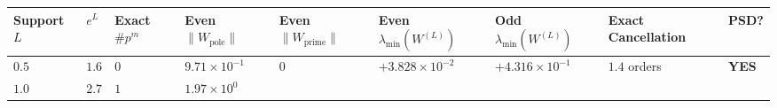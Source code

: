 \documentclass[
  11pt,
]{article}
\newcounter{none} %
\begin{document}
{\def\LTcaptype{none} %
\begin{longtable}[]{@{}
  >{\centering\arraybackslash}p{}
  >{\centering\arraybackslash}p{}
  >{\centering\arraybackslash}p{}
  >{\centering\arraybackslash}p{}
  >{\centering\arraybackslash}p{}
  >{\centering\arraybackslash}p{}
  >{\centering\arraybackslash}p{}
  >{\centering\arraybackslash}p{}
  >{\centering\arraybackslash}p{}@{}}
\toprule\noalign{}
\begin{minipage}[b]{\linewidth}\centering
Support \(L\)
\end{minipage} & \begin{minipage}[b]{\linewidth}\centering
\(e^L\)
\end{minipage} & \begin{minipage}[b]{\linewidth}\centering
Exact \(\#p^m\)
\end{minipage} & \begin{minipage}[b]{\linewidth}\centering
Even \(\|W_{\text{pole}}\|\)
\end{minipage} & \begin{minipage}[b]{\linewidth}\centering
Even \(\|W_{\text{prime}}\|\)
\end{minipage} & \begin{minipage}[b]{\linewidth}\centering
Even \(\lambda_{\min}(W^{(L)})\)
\end{minipage} & \begin{minipage}[b]{\linewidth}\centering
Odd \(\lambda_{\min}(W^{(L)})\)
\end{minipage} & \begin{minipage}[b]{\linewidth}\centering
Exact Cancellation
\end{minipage} & \begin{minipage}[b]{\linewidth}\centering
PSD?
\end{minipage} \\
\midrule\noalign{}
\endhead
\bottomrule\noalign{}
\endlastfoot
\(0.5\) & \(1.6\) & \(0\) & \(9.71 \times 10^{-1}\) & \(0\) &
\(+3.828 \times 10^{-2}\) & \(+4.316 \times 10^{-1}\) & \(1.4\) orders &
\textbf{YES} \\
\(1.0\) & \(2.7\) & \(1\) & \(1.97 \times 10^{0}\) &

\end{longtable}}
\end{document}
